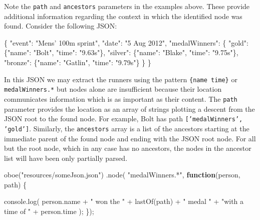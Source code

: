 \documentclass[]{article}
\newenvironment{Shaded}{}{}
\newcommand{\KeywordTok}[1]{\textcolor[rgb]{0.00,0.44,0.13}{\textbf{{#1}}}}
\newcommand{\StringTok}[1]{\textcolor[rgb]{0.25,0.44,0.63}{{#1}}}
\newcommand{\OtherTok}[1]{\textcolor[rgb]{0.00,0.44,0.13}{{#1}}}
\newcommand{\FunctionTok}[1]{\textcolor[rgb]{0.02,0.16,0.49}{{#1}}}
\newcommand{\NormalTok}[1]{{#1}}
\begin{document}
Note the \texttt{path} and \texttt{ancestors} parameters in the examples
above. These provide additional information regarding the context in
which the identified node was found. Consider the following JSON:

\begin{Shaded}
\begin{Highlighting}[]
\NormalTok{\{ }
   \StringTok{"event"}\NormalTok{: }\StringTok{"Mens' 100m sprint"}\NormalTok{,}
   \StringTok{"date"}\NormalTok{: }\StringTok{"5 Aug 2012"}\NormalTok{,}
   \StringTok{"medalWinners"}\NormalTok{: \{}
      \StringTok{"gold"}\NormalTok{:     \{}\StringTok{"name"}\NormalTok{: }\StringTok{"Bolt"}\NormalTok{,    }\StringTok{"time"}\NormalTok{: }\StringTok{"9.63s"}\NormalTok{\},}
      \StringTok{"silver"}\NormalTok{:   \{}\StringTok{"name"}\NormalTok{: }\StringTok{"Blake"}\NormalTok{,   }\StringTok{"time"}\NormalTok{: }\StringTok{"9.75s"}\NormalTok{\},}
      \StringTok{"bronze"}\NormalTok{:   \{}\StringTok{"name"}\NormalTok{: }\StringTok{"Gatlin"}\NormalTok{,  }\StringTok{"time"}\NormalTok{: }\StringTok{"9.79s"}\NormalTok{\}}
   \NormalTok{\}}
\NormalTok{\}  }
\end{Highlighting}
\end{Shaded}

In this JSON we may extract the runners using the pattern
\texttt{\{name time\}} or \texttt{medalWinners.*} but nodes alone are
insufficient because their location communicates information which is as
important as their content. The \texttt{path} parameter provides the
location as an array of strings plotting a descent from the JSON root to
the found node. For example, Bolt has path
\texttt{{[}'medalWinners', 'gold'{]}}. Similarly, the \texttt{ancestors}
array is a list of the ancestors starting at the immediate parent of the
found node and ending with the JSON root node. For all but the root
node, which in any case has no ancestors, the nodes in the ancestor list
will have been only partially parsed.

\begin{Shaded}
\begin{Highlighting}[]
\FunctionTok{oboe}\NormalTok{(}\StringTok{"resources/someJson.json"}\NormalTok{)}
   \NormalTok{.}\FunctionTok{node}\NormalTok{( }\StringTok{"medalWinners.*"}\NormalTok{, }\KeywordTok{function}\NormalTok{(person, path) \{}
   
      \OtherTok{console}\NormalTok{.}\FunctionTok{log}\NormalTok{( }\OtherTok{person}\NormalTok{.}\FunctionTok{name} \NormalTok{+ }\StringTok{" won the "} \NormalTok{+ }\FunctionTok{lastOf}\NormalTok{(path) + }\StringTok{" medal "}
         \NormalTok{+ }\StringTok{"with a time of "} \NormalTok{+ }\OtherTok{person}\NormalTok{.}\FunctionTok{time} \NormalTok{);}
   \NormalTok{\});}
\end{Highlighting}
\end{Shaded}
\end{document}
